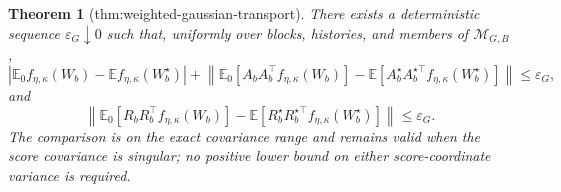\documentclass{article}
\newtheorem{theorem}{Theorem}
\begin{document}
\begin{theorem}[thm:weighted-gaussian-transport]\label{thm:weighted-gaussian-transport}
There exists a deterministic sequence \(\varepsilon_G\downarrow0\) such that, uniformly over blocks, histories, and members of \(\mathcal M_{G,B}\),
\[
\left|\mathbb E_0f_{\eta,\kappa}(W_b)-\mathbb Ef_{\eta,\kappa}(W_b^\star)\right|
+\left\|\mathbb E_0[A_bA_b^\top f_{\eta,\kappa}(W_b)]-\mathbb E[A_b^\star A_b^{\star\top}f_{\eta,\kappa}(W_b^\star)]\right\|
\leq\varepsilon_G,
\]
and
\[
\left\|\mathbb E_0[R_bR_b^\top f_{\eta,\kappa}(W_b)]-\mathbb E[R_b^\star R_b^{\star\top}f_{\eta,\kappa}(W_b^\star)]\right\|
\leq\varepsilon_G.
\]
The comparison is on the exact covariance range and remains valid when the score covariance is singular; no positive lower bound on either score-coordinate variance is required.
\end{theorem}
\end{document}
